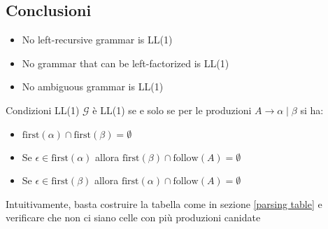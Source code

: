 \subsection{Conclusioni}
\begin{itemize}
	\item No left-recursive grammar is LL(1)
	\item No grammar that can be left-factorized is LL(1)
	\item No ambiguous grammar is LL(1)
\end{itemize}
\begin{teorema}{Condizioni LL(1)}
	$\mathcal{G}$ è LL(1) se e solo se per le produzioni $A \rightarrow \alpha \mid \beta$ si ha:

	\begin{itemize}
		\item $\text{first}(\alpha) \cap \text{first}(\beta) = \emptyset$
		\item Se $\epsilon \in \text{first}(\alpha)$ allora $\text{first}(\beta) \cap \text{follow}(A) = \emptyset$
		\item Se $\epsilon \in \text{first}(\beta)$ allora $\text{first}(\alpha) \cap \text{follow}(A) = \emptyset$
	\end{itemize}
\end{teorema}
Intuitivamente, basta costruire la tabella come in sezione \ref{parsing table} e verificare che non ci siano celle con più produzioni canidate
